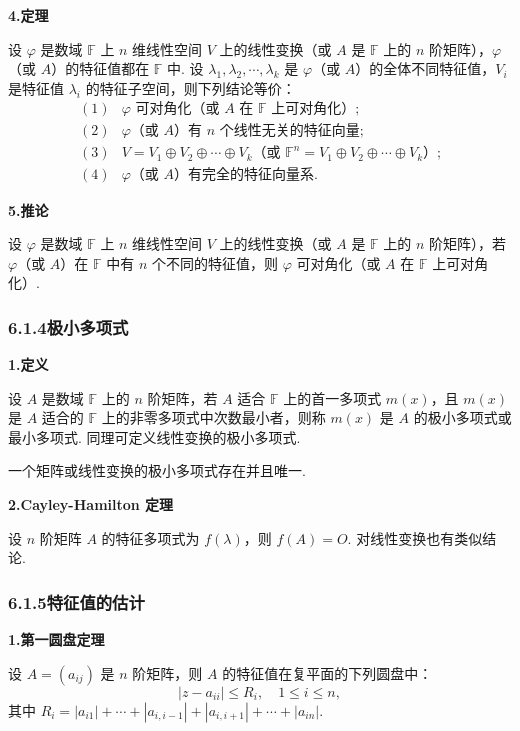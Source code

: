 \documentclass[UTF8, 12pt, fontset=fandol, oneside]{ctexart}
\begin{document}
\noindent\textbf{4.\quad 定理}

设 $\varphi$ 是数域 $\mathbb{F}$ 上 $n$ 维线性空间 $V$ 上的线性变换（或 $A$ 是 $\mathbb{F}$ 上的 $n$ 阶矩阵），$\varphi$（或 $A$）的特征值都在 $\mathbb{F}$ 中. 设 $\lambda_1,\lambda_2,\cdots,\lambda_k$ 是 $\varphi$（或 $A$）的全体不同特征值，$V_i$ 是特征值 $\lambda_i$ 的特征子空间，则下列结论等价：
\[
\begin{array}{ll}
(1) & \varphi\text{ 可对角化（或 }A\text{ 在 }\mathbb{F}\text{ 上可对角化）;}\\
(2) & \varphi\text{（或 }A\text{）有 }n\text{ 个线性无关的特征向量;}\\
(3) & V=V_1\oplus V_2\oplus\cdots\oplus V_k\text{（或 }\mathbb{F}^n=V_1\oplus V_2\oplus\cdots\oplus V_k\text{）;}\\
(4) & \varphi\text{（或 }A\text{）有完全的特征向量系.}
\end{array}
\]

\noindent\textbf{5.\quad 推论}

设 $\varphi$ 是数域 $\mathbb{F}$ 上 $n$ 维线性空间 $V$ 上的线性变换（或 $A$ 是 $\mathbb{F}$ 上的 $n$ 阶矩阵），若 $\varphi$（或 $A$）在 $\mathbb{F}$ 中有 $n$ 个不同的特征值，则 $\varphi$ 可对角化（或 $A$ 在 $\mathbb{F}$ 上可对角化）.

\subsubsection*{6.1.4\quad 极小多项式}

\noindent\textbf{1.\quad 定义}

设 $A$ 是数域 $\mathbb{F}$ 上的 $n$ 阶矩阵，若 $A$ 适合 $\mathbb{F}$ 上的首一多项式 $m(x)$，且 $m(x)$ 是 $A$ 适合的 $\mathbb{F}$ 上的非零多项式中次数最小者，则称 $m(x)$ 是 $A$ 的极小多项式或最小多项式. 同理可定义线性变换的极小多项式.

一个矩阵或线性变换的极小多项式存在并且唯一.

\noindent\textbf{2.\quad Cayley-Hamilton 定理}

设 $n$ 阶矩阵 $A$ 的特征多项式为 $f(\lambda)$，则 $f(A)=O$. 对线性变换也有类似结论.

\subsubsection*{6.1.5\quad 特征值的估计}

\noindent\textbf{1.\quad 第一圆盘定理}

设 $A=(a_{ij})$ 是 $n$ 阶矩阵，则 $A$ 的特征值在复平面的下列圆盘中：
\[
|z-a_{ii}|\le R_i,\quad 1\le i\le n,
\]
其中 $R_i=|a_{i1}|+\cdots+|a_{i,i-1}|+|a_{i,i+1}|+\cdots+|a_{in}|$.
\end{document}
